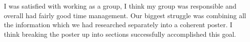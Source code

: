 \documentclass[12pt]{article}
\begin{document}
I was satisfied with working as a group, I think my group was responsible and overall had fairly good time management. Our biggest struggle was combining
all the information which we had researched separately into a coherent poster. I think breaking the poster up into sections successfully accomplished this goal.
\end{document}
